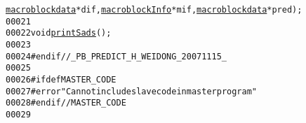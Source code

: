 \begin{footnotesize}
\begin{alltt}
      \hyperlink{structmacroblockdata}{macroblockdata} *dif, \hyperlink{structmacroblock_info}{macroblockInfo} *mif, \hyperlink{structmacroblockdata}{macroblockdata} *pred);
00021 
00022 \textcolor{keywordtype}{void} \hyperlink{_m_v_c_common_lib_2_codec_2_p_b_predict_8h_ab77dc06916e76b6e4dd24da969b5f4b4}{printSads}();
00023 
00024 \textcolor{preprocessor}{#endif //\_PB\_PREDICT\_H\_WEIDONG\_20071115\_}
00025 \textcolor{preprocessor}{}
00026 \textcolor{preprocessor}{#ifdef MASTER\_CODE}
00027 \textcolor{preprocessor}{}\textcolor{preprocessor}{#error "Can not include slave code in master program"}
00028 \textcolor{preprocessor}{}\textcolor{preprocessor}{#endif // MASTER\_CODE}
00029 \textcolor{preprocessor}{}
\end{alltt}\end{footnotesize}
